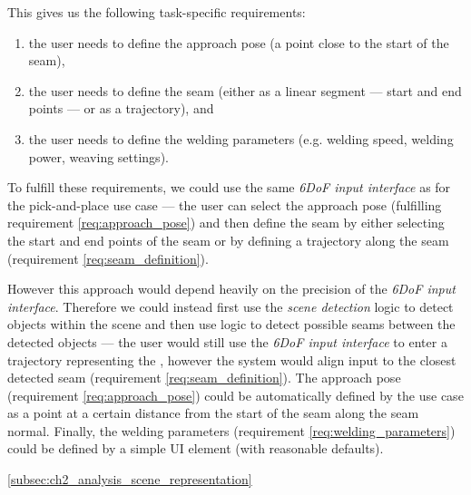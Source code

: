 This gives us the following task-specific requirements:
\begin{enumerate}[label=(\roman*), itemsep=0.2em]
    \item the user needs to define the approach pose (a point close to the start of the seam), \label{req:approach_pose}
    \item the user needs to define the seam (either as a linear segment --- start and end points --- or as a trajectory), and \label{req:seam_definition}
    \item the user needs to define the welding parameters (e.g. welding speed, welding power, weaving settings). \label{req:welding_parameters}
\end{enumerate}
To fulfill these requirements, we could use the same \emph{6DoF input interface} as for the pick-and-place use case --- the user can select the approach pose (fulfilling requirement \ref{req:approach_pose}) and then define the seam by either selecting the start and end points of the seam or by defining a trajectory along the seam (requirement \ref{req:seam_definition}).

However this approach would depend heavily on the precision of the \emph{6DoF input interface}. Therefore we could instead first use the \emph{scene detection} logic to detect objects within the scene and then use \DIFdelbegin {}\DIFdelend \DIFaddbegin {}\DIFaddend logic to detect possible seams between the detected objects --- the user would \DIFdelbegin {}\DIFdelend still use the \emph{6DoF input interface} to enter a trajectory representing the \DIFdelbegin {}\DIFdelend \DIFaddbegin {}\DIFaddend , however the system would align \DIFdelbegin {}\DIFdelend \DIFaddbegin {}\DIFaddend input to the closest detected seam (requirement \ref{req:seam_definition}). The approach pose (requirement \ref{req:approach_pose}) could be automatically defined by the use case as a point at a certain distance from the start of the seam along the seam normal. Finally, the welding parameters (requirement \ref{req:welding_parameters}) could be defined by a simple UI element (with reasonable defaults).

\DIFaddbegin {}\autoref{subsec:ch2_analysis_scene_representation}

